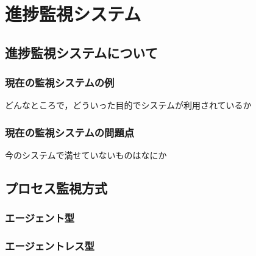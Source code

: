 \chapter{進捗監視システム}

\section{進捗監視システムについて}

\subsection{現在の監視システムの例}
どんなところで，どういった目的でシステムが利用されているか

\subsection{現在の監視システムの問題点}
今のシステムで満せていないものはなにか

\section{プロセス監視方式}

\subsection{エージェント型}

\subsection{エージェントレス型}



